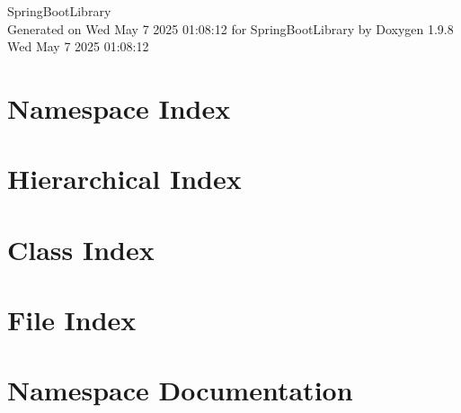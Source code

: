 \documentclass[twoside]{book}
\newcommand{\+}{\discretionary{\mbox{\scriptsize$\hookleftarrow$}}{}{}}
\newcommand{\clearemptydoublepage}{%
    \newpage{\pagestyle{empty}\cleardoublepage}%
  }
\begin{document}
  \raggedbottom
    \hypersetup{pageanchor=false,
                bookmarksnumbered=true,
                pdfencoding=unicode
               }
  \begin{titlepage}
  \vspace*{7cm}
  \begin{center}%
  {\Large Spring\+Boot\+Library}\\
  \vspace*{1cm}
  {\large Generated on Wed May 7 2025 01\+:08\+:12 for Spring\+Boot\+Library by Doxygen 1.9.8}\\
    \vspace*{0.5cm}
    {\small Wed May 7 2025 01:08:12}
  \end{center}
  \end{titlepage}
  \clearemptydoublepage
  \tableofcontents
  \clearemptydoublepage
  \hypersetup{pageanchor=true}
\chapter{Namespace Index}

\chapter{Hierarchical Index}

\chapter{Class Index}

\chapter{File Index}

\chapter{Namespace Documentation}








\end{document}
